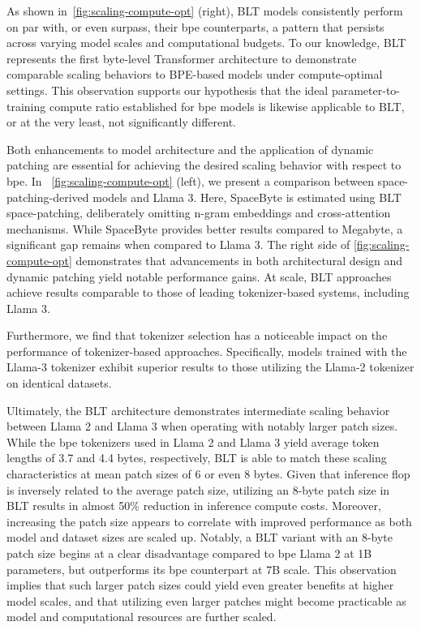 As shown in~\autoref{fig:scaling-compute-opt} (right), {\textsc BLT} models consistently perform on par with, or even surpass, their bpe counterparts, a pattern that persists across varying model scales and computational budgets. To our knowledge, {\textsc BLT} represents the first byte-level Transformer architecture to demonstrate comparable scaling behaviors to BPE-based models under compute-optimal settings. This observation supports our hypothesis that the ideal parameter-to-training compute ratio established for bpe models is likewise applicable to {\textsc BLT}, or at the very least, not significantly different.

Both enhancements to model architecture and the application of dynamic patching are essential for achieving the desired scaling behavior with respect to bpe. In ~\autoref{fig:scaling-compute-opt} (left), we present a comparison between space-patching-derived models and Llama 3. Here, SpaceByte \citep{slagle2024spacebyte} is estimated using {\textsc BLT} space-patching, deliberately omitting n-gram embeddings and cross-attention mechanisms. While SpaceByte provides better results compared to Megabyte, a significant gap remains when compared to Llama 3. The right side of \autoref{fig:scaling-compute-opt} demonstrates that advancements in both architectural design and dynamic patching yield notable performance gains. At scale, {\textsc BLT} approaches achieve results comparable to those of leading tokenizer-based systems, including Llama 3.

Furthermore, we find that tokenizer selection has a noticeable impact on the performance of tokenizer-based approaches. Specifically, models trained with the Llama-3 tokenizer exhibit superior results to those utilizing the Llama-2 tokenizer on identical datasets.

Ultimately, the {\textsc BLT} architecture demonstrates intermediate scaling behavior between Llama 2 and Llama 3 when operating with notably larger patch sizes. While the bpe tokenizers used in Llama 2 and Llama 3 yield average token lengths of 3.7 and 4.4 bytes, respectively, {\textsc BLT} is able to match these scaling characteristics at mean patch sizes of 6 or even 8 bytes. Given that inference flop is inversely related to the average patch size, utilizing an 8-byte patch size in {\textsc BLT} results in almost 50\% reduction in inference compute costs. Moreover, increasing the patch size appears to correlate with improved performance as both model and dataset sizes are scaled up. Notably, a {\textsc BLT} variant with an 8-byte patch size begins at a clear disadvantage compared to bpe Llama 2 at 1B parameters, but outperforms its bpe counterpart at 7B scale. This observation implies that such larger patch sizes could yield even greater benefits at higher model scales, and that utilizing even larger patches might become practicable as model and computational resources are further scaled.

